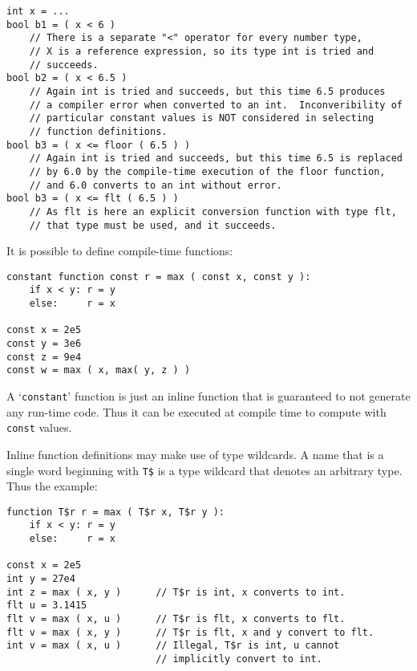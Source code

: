 \documentclass[12pt]{article}
\newenvironment{indpar}[1][0.3in]%
	{\begin{list}{}%
		     {\setlength{\itemsep}{0in}%
		      \setlength{\topsep}{0in}%
		      \setlength{\parsep}{1ex}%
		      \setlength{\labelwidth}{#1}%
		      \setlength{\leftmargin}{#1}%
		      \addtolength{\leftmargin}{\labelsep}}%
	 \item}%
	{\end{list}}
\begin{document}
\begin{indpar}\begin{verbatim}
int x = ...
bool b1 = ( x < 6 )
    // There is a separate "<" operator for every number type,
    // X is a reference expression, so its type int is tried and
    // succeeds.
bool b2 = ( x < 6.5 )
    // Again int is tried and succeeds, but this time 6.5 produces
    // a compiler error when converted to an int.  Inconveribility of
    // particular constant values is NOT considered in selecting
    // function definitions.
bool b3 = ( x <= floor ( 6.5 ) )
    // Again int is tried and succeeds, but this time 6.5 is replaced
    // by 6.0 by the compile-time execution of the floor function,
    // and 6.0 converts to an int without error.
bool b3 = ( x <= flt ( 6.5 ) )
    // As flt is here an explicit conversion function with type flt,
    // that type must be used, and it succeeds.
\end{verbatim}\end{indpar}

It is possible to define compile-time functions:

\begin{indpar}\begin{verbatim}
constant function const r = max ( const x, const y ):
    if x < y: r = y
    else:     r = x

const x = 2e5
const y = 3e6
const z = 9e4
const w = max ( x, max( y, z ) )
\end{verbatim}\end{indpar}

A `{\tt constant}' function is just an inline function that
is guaranteed to not generate any run-time code.
Thus it can be executed at compile time to compute with
{\tt const} values.

Inline function definitions may make use of type wildcards.
A name that is a single word beginning with {\tt T\$}
is a type wildcard that denotes
an arbitrary type.  Thus the example:

\begin{indpar}\begin{verbatim}
function T$r r = max ( T$r x, T$r y ):
    if x < y: r = y
    else:     r = x

const x = 2e5
int y = 27e4
int z = max ( x, y )      // T$r is int, x converts to int.
flt u = 3.1415
flt v = max ( x, u )      // T$r is flt, x converts to flt.
flt v = max ( x, y )      // T$r is flt, x and y convert to flt.
int v = max ( x, u )      // Illegal, T$r is int, u cannot
                          // implicitly convert to int.
\end{verbatim}\end{indpar}
\end{document}
